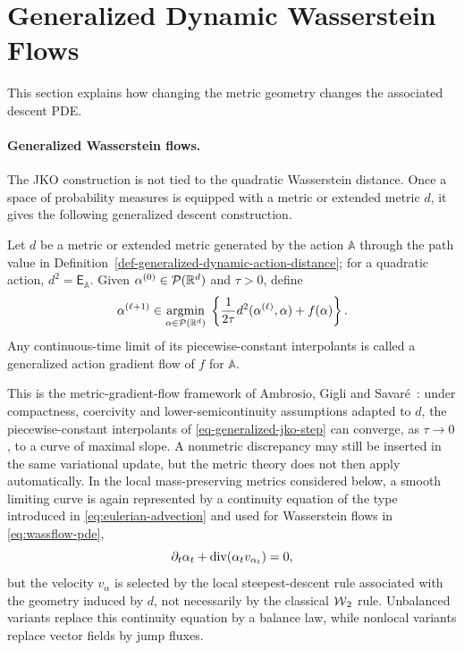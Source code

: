 \section{Generalized Dynamic Wasserstein Flows}
\label{sec-generalized-dynamic-wasserstein-flows}

This section explains how changing the metric geometry changes the associated descent PDE.

\paragraph{Generalized Wasserstein flows.}
The JKO construction is not tied to the quadratic Wasserstein distance. Once a space of probability measures is equipped with a metric or extended metric \(d\), it gives the following generalized descent construction.
\begin{defn}\label{def-generalized-action-gradient-flow}
Let $d$ be a metric or extended metric generated by the action $\mathbb A$ through the path value in Definition~\ref{def-generalized-dynamic-action-distance}; for a quadratic action, $d^2=\mathsf E_{\mathbb A}$. Given \(\alpha^{(0)}\in\mathcal{P}(\mathbb{R}^d)\) and \(\tau>0\), define
\begin{equation}\label{eq-generalized-jko-step}
	\alpha^{(\ell+1)}
	\in
	\underset{\alpha\in\mathcal{P}(\mathbb{R}^d)}{\operatorname{argmin}}\;
	\left\{\frac{1}{2\tau}d^2(\alpha^{(\ell)},\alpha)+f(\alpha)\right\}.
\end{equation}
Any continuous-time limit of its piecewise-constant interpolants is called a generalized action gradient flow of \(f\) for \(\mathbb A\).
\end{defn}
This is the metric-gradient-flow framework of Ambrosio, Gigli and Savar\'e~\cite{ambrosio2006gradient,gigli2011user}: under compactness, coercivity and lower-semicontinuity assumptions adapted to \(d\), the piecewise-constant interpolants of \eqref{eq-generalized-jko-step} can converge, as \(\tau\to0\), to a curve of maximal slope. A nonmetric discrepancy may still be inserted in the same variational update, but the metric theory does not then apply automatically. In the local mass-preserving metrics considered below, a smooth limiting curve is again represented by a continuity equation of the type introduced in \eqref{eq:eulerian-advection} and used for Wasserstein flows in \eqref{eq:wassflow-pde},
\begin{equation}\label{eq-generalized-flow-continuity-motivation}
	\partial_t\alpha_t+\operatorname{div}(\alpha_t v_{\alpha_t})=0,
\end{equation}
but the velocity \(v_{\alpha}\) is selected by the local steepest-descent rule associated with the geometry induced by \(d\), not necessarily by the classical \(\operatorname{\mathcal{W}}_2\) rule. Unbalanced variants replace this continuity equation by a balance law, while nonlocal variants replace vector fields by jump fluxes.

